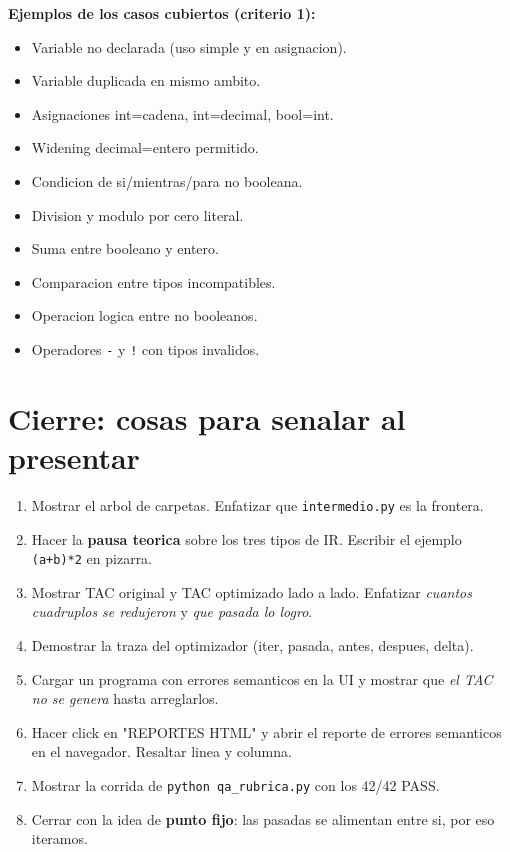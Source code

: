 \documentclass[11pt,a4paper]{article}
\begin{document}
\textbf{Ejemplos de los casos cubiertos (criterio 1):}
\begin{itemize}[leftmargin=*,nosep]
  \item Variable no declarada (uso simple y en asignacion).
  \item Variable duplicada en mismo ambito.
  \item Asignaciones int=cadena, int=decimal, bool=int.
  \item Widening decimal=entero permitido.
  \item Condicion de si/mientras/para no booleana.
  \item Division y modulo por cero literal.
  \item Suma entre booleano y entero.
  \item Comparacion entre tipos incompatibles.
  \item Operacion logica entre no booleanos.
  \item Operadores \texttt{-} y \texttt{!} con tipos invalidos.
\end{itemize}

\section{Cierre: cosas para senalar al presentar}

\begin{enumerate}[leftmargin=*,nosep]
  \item Mostrar el arbol de carpetas. Enfatizar que
        \texttt{intermedio.py} es la frontera.
  \item Hacer la \textbf{pausa teorica} sobre los tres tipos de IR.
        Escribir el ejemplo \texttt{(a+b)*2} en pizarra.
  \item Mostrar TAC original y TAC optimizado lado a lado. Enfatizar
        \emph{cuantos cuadruplos se redujeron} y \emph{que pasada lo
        logro}.
  \item Demostrar la traza del optimizador (iter, pasada, antes,
        despues, delta).
  \item Cargar un programa con errores semanticos en la UI y mostrar
        que \emph{el TAC no se genera} hasta arreglarlos.
  \item Hacer click en "REPORTES HTML" y abrir el reporte de errores
        semanticos en el navegador. Resaltar linea y columna.
  \item Mostrar la corrida de \texttt{python qa\_rubrica.py} con los
        42/42 PASS.
  \item Cerrar con la idea de \textbf{punto fijo}: las pasadas se
        alimentan entre si, por eso iteramos.
\end{enumerate}
\end{document}
